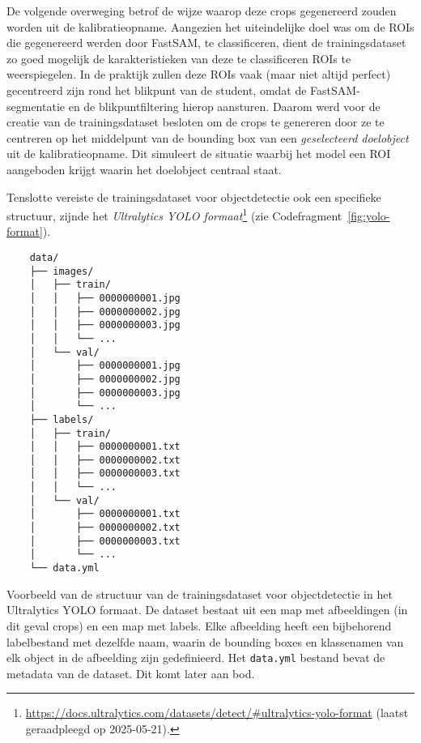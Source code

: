 De volgende overweging betrof de wijze waarop deze crops gegenereerd zouden worden uit de kalibratieopname. 
Aangezien het uiteindelijke doel was om de ROIs die gegenereerd werden door FastSAM, te classificeren, 
dient de trainingsdataset zo goed mogelijk de karakteristieken van deze te classificeren ROIs te weerspiegelen. 
In de praktijk zullen deze ROIs vaak (maar niet altijd perfect) gecentreerd zijn rond het blikpunt van de student, 
omdat de FastSAM-segmentatie en de blikpuntfiltering hierop aansturen. 
Daarom werd voor de creatie van de trainingsdataset besloten om de crops te genereren 
door ze te centreren op het middelpunt van de bounding box van een \textit{geselecteerd doelobject} uit de kalibratieopname. 
Dit simuleert de situatie waarbij het model een ROI aangeboden krijgt waarin het doelobject centraal staat.

Tenslotte vereiste de trainingsdataset voor objectdetectie ook een specifieke structuur, zijnde het 
\textit{Ultralytics YOLO formaat}\footnote{\url{https://docs.ultralytics.com/datasets/detect/\#ultralytics-yolo-format} (laatst geraadpleegd op 2025-05-21).} (zie Codefragment~\ref{fig:yolo-format}).

\begin{listing}[H]
  \begin{verbatim}
    data/
    ├── images/
    │   ├── train/
    │   │   ├── 0000000001.jpg
    │   │   ├── 0000000002.jpg
    │   │   ├── 0000000003.jpg
    │   │   └── ...
    │   └── val/
    │       ├── 0000000001.jpg
    │       ├── 0000000002.jpg
    │       ├── 0000000003.jpg
    │       └── ...
    ├── labels/
    │   ├── train/
    │   │   ├── 0000000001.txt
    │   │   ├── 0000000002.txt
    │   │   ├── 0000000003.txt
    │   │   └── ...
    │   └── val/
    │       ├── 0000000001.txt
    │       ├── 0000000002.txt
    │       ├── 0000000003.txt
    │       └── ...
    └── data.yml
  \end{verbatim}
  \caption[Voorbeeld van het Ultralytics YOLO Formaat]{
    \label{fig:yolo-format}
    Voorbeeld van de structuur van de trainingsdataset voor objectdetectie in het Ultralytics YOLO formaat.
    De dataset bestaat uit een map met afbeeldingen (in dit geval crops) en een map met labels.
    Elke afbeelding heeft een bijbehorend labelbestand met dezelfde naam, waarin de bounding boxes en klassenamen van elk object in de afbeelding zijn gedefinieerd.
    Het \texttt{data.yml} bestand bevat de metadata van de dataset. Dit komt later aan bod.
  }
\end{listing}

